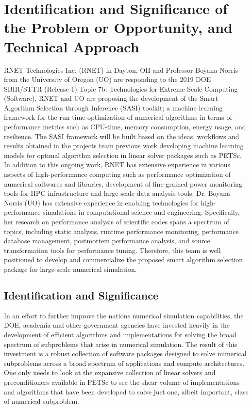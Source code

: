 \section{Identification and Significance of the Problem or Opportunity, and Technical Approach}

RNET Technologies Inc. (RNET) in Dayton, OH and Professor Boyana Norris from the University of Oregon (UO) are responding to the 2019 DOE 
SBIR/STTR (Release 1) Topic 7b: Technologies for Extreme Scale Computing (Software). RNET and UO are proposing the development of the Smart Algorithm Selection through Inference (SASI) toolkit; a machine learning framework for the run-time optimization of numerical algorithms in terms of performance metrics such as CPU-time, memory consumption, energy usage, and resilience. The SASI framework will be built based on the ideas, workflows and results obtained in the projects team previous work developing machine learning models for optimal algorithm selection in linear solver packages such as PETSc. In addition to this ongoing work, RNET has extensive experience in various aspects of high-performance computing such as performance 
optimization of numerical softwares and libraries, development of fine-grained power monitoring tools 
for HPC infrastructure and large scale data analysis tools. Dr. Boyana Norris (UO) has extensive experience 
in enabling technologies for high-performance simulations in computational science and engineering. 
Specifically, her research on performance analysis of scientific codes spans a spectrum of topics, 
including static analysis, runtime performance monitoring, performance database management, postmortem 
performance analysis, and source transformation tools for performance tuning. Therefore, 
this team is well positioned to develop and commercialize the proposed smart algorithm selection package for 
large-scale numerical simulation. 


\subsection{Identification and Significance}
\label{sec:introduction}

In an effort to further improve the nations numerical simulation capabilities, the DOE, academia and other government agencies have invested heavily in the development of efficient algorithms and implementations for solving the broad spectrum of subproblems that arise in numerical simulation.  The result of this investment is a robust collection of software packages designed to solve numerical subproblems across a broad spectrum of applications and compute architectures. One only needs to look at the expansive collection of linear solvers and preconditioners available in PETSc to see the shear volume of implementations and algorithms that have been developed to solve just one, albeit important, class of numerical subproblem.  

